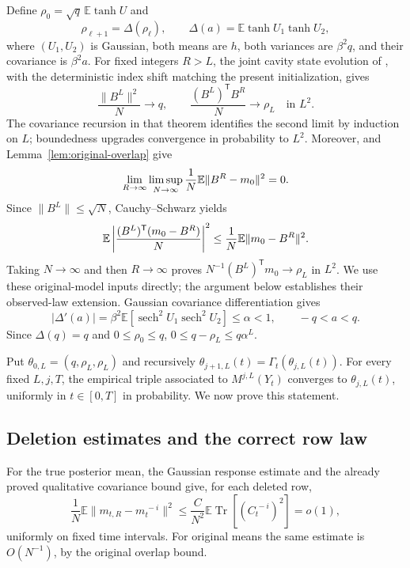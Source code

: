 \documentclass[11pt,reqno]{amsart}
\begin{document}
Define $\rho_0=\sqrt q\,\mathbb E\tanh U$ and
\[
 \rho_{\ell+1}=\Delta(\rho_\ell),\qquad
 \Delta(a)=\mathbb E\tanh U_1\tanh U_2,
\]
where $(U_1,U_2)$ is Gaussian, both means are $h$, both variances are
$\beta^2q$, and their covariance is $\beta^2a$.
For fixed integers $R>L$, the joint cavity state evolution of
\cite[Theorem~1]{chen2021convergence}, with the deterministic index
shift matching the present initialization, gives
\[
 \frac{\|B^L\|^2}{N}\longrightarrow q,\qquad
 \frac{(B^L)^{\mathsf T}B^R}{N}\longrightarrow\rho_L
 \quad\text{in }L^2.
\]
The covariance recursion in that theorem identifies the second limit
by induction on $L$; boundedness upgrades convergence in probability
to $L^2$. Moreover,
\cite[Theorems~2 and~3]{chen2021convergence} and
Lemma~\ref{lem:original-overlap} give
\[
 \lim_{R\to\infty}\limsup_{N\to\infty}
       \frac1N{\mathbb{E}}\|B^R-m_0\|^2=0.
\]
Since $\|B^L\|\le\sqrt N$, Cauchy--Schwarz yields
\[
 {\mathbb{E}}\left|\frac{(B^L)^{\mathsf T}(m_0-B^R)}N\right|^2
 \le \frac1N{\mathbb{E}}\|m_0-B^R\|^2.
\]
Taking $N\to\infty$ and then $R\to\infty$ proves
$N^{-1}(B^L)^{\mathsf T}m_0\to\rho_L$ in $L^2$.
We use these original-model inputs directly; the argument below
establishes their observed-law extension.
Gaussian covariance differentiation gives
\[
 |\Delta'(a)|
 =\beta^2\mathbb E[\operatorname{sech}^2U_1\operatorname{sech}^2U_2]
 \le\alpha<1,\qquad -q<a<q.
\]
Since $\Delta(q)=q$ and $0\le\rho_0\le q$,
$0\le q-\rho_L\le q\alpha^L$.

Put $\theta_{0,L}=(q,\rho_L,\rho_L)$ and recursively
$\theta_{j+1,L}(t)=\Gamma_t(\theta_{j,L}(t))$.
For every fixed $L,j,T$, the empirical triple associated to
$M^{j,L}(Y_t)$ converges to $\theta_{j,L}(t)$, uniformly in
$t\in[0,T]$ in probability. We now prove this statement.

\subsection{Deletion estimates and the correct row law}

For the true posterior mean, the Gaussian response estimate and the
already proved qualitative covariance bound give, for each deleted row,
\[
 \frac1N\mathbb E\|m_{t,R}-m_t^{\,-i}\|^2
 \le\frac C{N^2}\mathbb E\operatorname{Tr}[(C_t^{\,-i})^2]=o(1),
\]
uniformly on fixed time intervals.  For original means the same estimate
is $O(N^{-1})$, by the original overlap bound.
\end{document}
